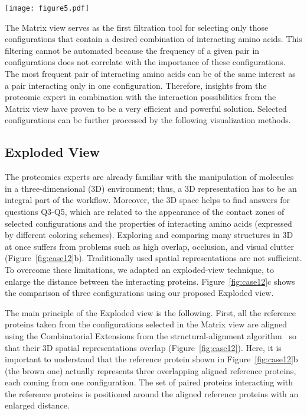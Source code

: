 \documentclass[twocolumn]{bmcart}%
\def\ExpView {Exploded view\xspace}
\def\MatView {Matrix view\xspace}
\begin{document}
\begin{figure*}[tb]
    \centering
    \texttt{[image: figure5.pdf]}
    \caption{
    (a)~Three configurations represented by surfaces with highlighted contact zones. (b)~Aligned configurations. Their contact zones are almost completely occluded. (c)~\ExpView of these configurations. A different color is used for each contact zone.}
	\label{fig:case12}
\end{figure*}

The \MatView serves as the first filtration tool for selecting only those configurations that contain a desired combination of interacting amino acids.
This filtering cannot be automated because the frequency of a given pair in configurations does not correlate with the importance of these configurations.
The most frequent pair of interacting amino acids can be of the same interest as a pair interacting only in one configuration.
Therefore, insights from the proteomic expert in combination with the interaction possibilities from the \MatView have proven to be a very efficient and powerful solution.
Selected configurations can be further processed by the following visualization methods.



\subsection*{Exploded View}
The proteomics experts are already familiar with the manipulation of molecules in a three-dimensional (3D) environment; thus, a 3D representation has to be an integral part of the workflow.
Moreover, the 3D space helps to find answers for questions Q3-Q5, which are related to the appearance of the contact zones of selected configurations and the properties of interacting amino acids (expressed by different coloring schemes).
Exploring and comparing many structures in 3D at once suffers from problems such as high overlap, occlusion, and visual clutter (Figure~\ref{fig:case12}b). 
Traditionally used spatial representations are not sufficient.
To overcome these limitations, we adapted an exploded-view technique, to enlarge the distance between the interacting proteins. 
Figure~\ref{fig:case12}c shows the comparison of three configurations using our proposed \ExpView.

The main principle of the \ExpView is the following.
First, all the reference proteins taken from the configurations selected in the \MatView are aligned using the Combinatorial Extensions from the structural-alignment algorithm~\cite{Shindyalov1998} so that their 3D spatial representations overlap (Figure~\ref{fig:case12}). 
Here, it is important to understand that the reference protein shown in Figure~\ref{fig:case12}b (the brown one) actually represents three overlapping aligned reference proteins, each coming from one configuration.
The set of paired proteins interacting with the reference proteins is positioned around the aligned reference proteins with an enlarged distance.
\end{document}
